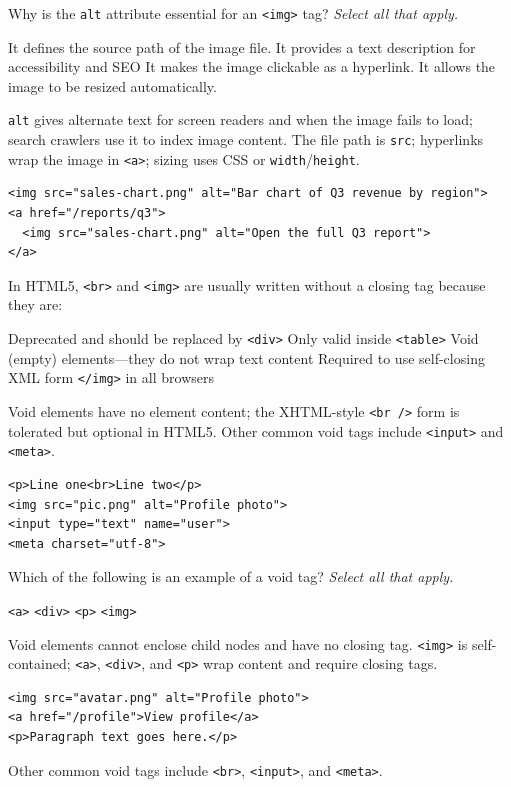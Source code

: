 \question[4]
Why is the \texttt{alt} attribute essential for an \texttt{<img>} tag? \emph{Select all that apply.}
\begin{checkboxes}
  \choice It defines the source path of the image file.
  \CorrectChoice It provides a text description for accessibility and SEO
  \choice It makes the image clickable as a hyperlink.
  \choice It allows the image to be resized automatically.
\end{checkboxes}
\begin{solution}
  \texttt{alt} gives alternate text for screen readers and when the image fails to load; search crawlers use it to index image content. The file path is \texttt{src}; hyperlinks wrap the image in \texttt{<a>}; sizing uses CSS or \texttt{width}/\texttt{height}.
\begin{lstlisting}[style=htmlinline]
<img src="sales-chart.png" alt="Bar chart of Q3 revenue by region">
<a href="/reports/q3">
  <img src="sales-chart.png" alt="Open the full Q3 report">
</a>
\end{lstlisting}
\end{solution}

\question[4]
In HTML5, \texttt{<br>} and \texttt{<img>} are usually written without a closing tag because they are:
\begin{choices}
  \choice Deprecated and should be replaced by \texttt{<div>}
  \choice Only valid inside \texttt{<table>}
  \CorrectChoice Void (empty) elements---they do not wrap text content
  \choice Required to use self-closing XML form \texttt{</img>} in all browsers
\end{choices}
\begin{solution}
  Void elements have no element content; the XHTML-style \texttt{<br />} form is tolerated but optional in HTML5. Other common void tags include \texttt{<input>} and \texttt{<meta>}.
\begin{lstlisting}[style=htmlinline]
<p>Line one<br>Line two</p>
<img src="pic.png" alt="Profile photo">
<input type="text" name="user">
<meta charset="utf-8">
\end{lstlisting}
\end{solution}

\question[4]
Which of the following is an example of a void tag? \emph{Select all that apply.}
\begin{checkboxes}
  \choice \texttt{<a>}
  \choice \texttt{<div>}
  \choice \texttt{<p>}
  \CorrectChoice \texttt{<img>}
\end{checkboxes}
\begin{solution}
  Void elements cannot enclose child nodes and have no closing tag. \texttt{<img>} is self-contained; \texttt{<a>}, \texttt{<div>}, and \texttt{<p>} wrap content and require closing tags.
\begin{lstlisting}[style=htmlinline]
<img src="avatar.png" alt="Profile photo">
<a href="/profile">View profile</a>
<p>Paragraph text goes here.</p>
\end{lstlisting}
  Other common void tags include \texttt{<br>}, \texttt{<input>}, and \texttt{<meta>}.
\end{solution}

